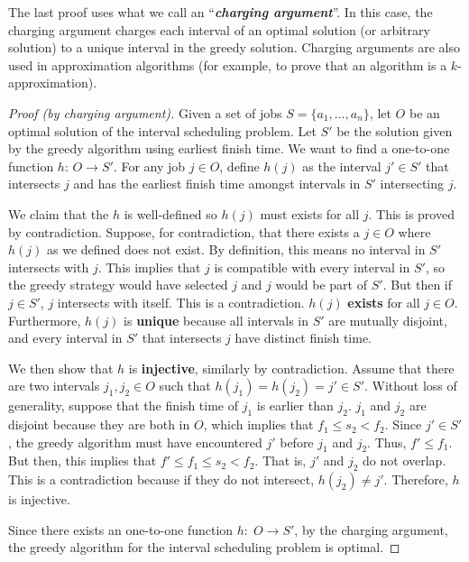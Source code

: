 The last proof uses what we call an ``\textit{\textbf{charging argument}}''. In this case, the charging argument charges each interval of an optimal solution (or arbitrary solution) to a unique interval in the greedy solution. Charging arguments are also used in approximation algorithms (for example, to prove that an algorithm is a $k$-approximation).

\begin{proof}[Proof (by charging argument)] 
    Given a set of jobs $S = \{a_1,\ldots,a_n\}$, let $O$ be an optimal solution of the interval scheduling problem. Let $S'$ be the solution given by the greedy algorithm using earliest finish time. We want to find a one-to-one function $h:\, O \to S'$. For any job $j \in O$, define $h(j)$ as the interval $j' \in S'$ that intersects $j$ and has the earliest finish time amongst intervals in $S'$ intersecting $j$.

    We claim that the $h$ is well-defined so $h(j)$ must exists for all $j$. This is proved by contradiction. Suppose, for contradiction, that there exists a $j \in O$ where $h(j)$ as we defined does not exist. By definition, this means no interval in $S'$ intersects with $j$. This implies that $j$ is compatible with every interval in $S'$, so the greedy strategy would have selected $j$ and $j$ would be part of $S'$. But then if $j \in S'$, $j$ intersects with itself. This is a contradiction. $h(j)$ \textbf{exists} for all $j \in O$. Furthermore, $h(j)$ is \textbf{unique} because all intervals in $S'$ are mutually disjoint, and every interval in $S'$ that intersects $j$ have distinct finish time.

    We then show that $h$ is \textbf{injective}, similarly by contradiction. Assume that there are two intervals $j_1,j_2 \in O$ such that $h(j_1) = h(j_2) = j' \in S'$. Without loss of generality, suppose that the finish time of $j_1$ is earlier than $j_2$. $j_1$ and $j_2$ are disjoint because they are both in $O$, which implies that $f_1 \leq s_2 < f_2$. Since $j' \in S'$, the greedy algorithm must have encountered $j'$ before $j_1$ and $j_2$. Thus, $f' \leq f_1$. But then, this implies that $f' \leq f_1 \leq s_2 < f_2$. That is, $j'$ and $j_2$ do not overlap. This is a contradiction because if they do not intersect, $h(j_2) \neq j'$. Therefore, $h$ is injective.
    
    Since there exists an one-to-one function $h:\; O \to S'$, by the charging argument, the greedy algorithm for the interval scheduling problem is optimal.
\end{proof}

